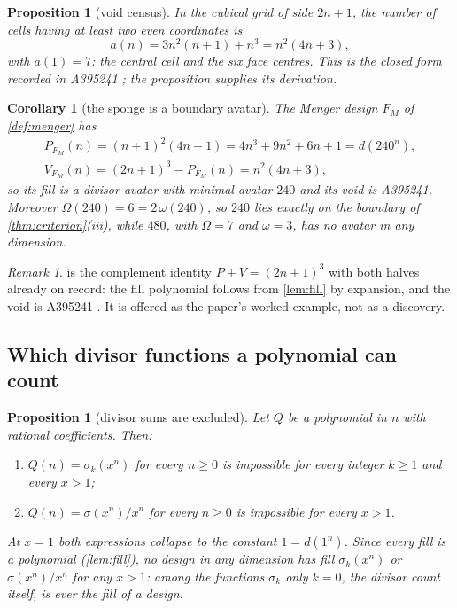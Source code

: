 \documentclass[11pt]{amsart}
\newtheorem{proposition}[theorem]{Proposition}
\newtheorem{corollary}[theorem]{Corollary}
\theoremstyle{definition}
\theoremstyle{remark}
\newtheorem{remark}[theorem]{Remark}
\begin{document}
\begin{proposition}[void census]
\label{prop:void}
In the cubical grid of side $2n+1$, the number of cells having at least two even coordinates is
\[
  a(n) = 3n^{2}(n+1) + n^{3} = n^{2}(4n+3),
\]
with $a(1)=7$: the central cell and the six face centres. This is the closed form recorded in A395241 \cite{a395241}; the proposition supplies its derivation.
\end{proposition}

\begin{corollary}[the sponge is a boundary avatar]
\label{cor:bridge}
The Menger design $F_{M}$ of \cref{def:menger} has
\begin{gather*}
  P_{F_{M}}(n) = (n+1)^{2}(4n+1) = 4n^{3}+9n^{2}+6n+1 = d(240^{n}),\\
  V_{F_{M}}(n) = (2n+1)^{3} - P_{F_{M}}(n) = n^{2}(4n+3),
\end{gather*}
so its fill is a divisor avatar with minimal avatar $240$ and its void is A395241. Moreover $\Omega(240)=6=2\,\omega(240)$, so $240$ lies exactly on the boundary of \cref{thm:criterion}(iii), while $480$, with $\Omega=7$ and $\omega=3$, has no avatar in any dimension.
\end{corollary}

\begin{remark}
\label{rem:bridge}
 is the complement identity $P+V=(2n+1)^{3}$ with both halves already on record: the fill polynomial follows from \cref{lem:fill} by expansion, and the void is A395241 \cite{a395241}. It is offered as the paper's worked example, not as a discovery.
\end{remark}

\subsection*{Which divisor functions a polynomial can count}

\begin{proposition}[divisor sums are excluded]
\label{prop:sigmak}
Let $Q$ be a polynomial in $n$ with rational coefficients. Then:
\begin{enumerate}
\item[(i)] $Q(n) = \sigma_{k}(x^{n})$ for every $n \ge 0$ is impossible for every integer $k \ge 1$ and every $x > 1$;
\item[(ii)] $Q(n) = \sigma(x^{n})/x^{n}$ for every $n \ge 0$ is impossible for every $x > 1$.
\end{enumerate}
At $x = 1$ both expressions collapse to the constant $1 = d(1^{n})$. Since every fill is a polynomial (\cref{lem:fill}), no design in any dimension has fill $\sigma_{k}(x^{n})$ or $\sigma(x^{n})/x^{n}$ for any $x > 1$: among the functions $\sigma_{k}$ only $k=0$, the divisor count itself, is ever the fill of a design.
\end{proposition}
\end{document}
